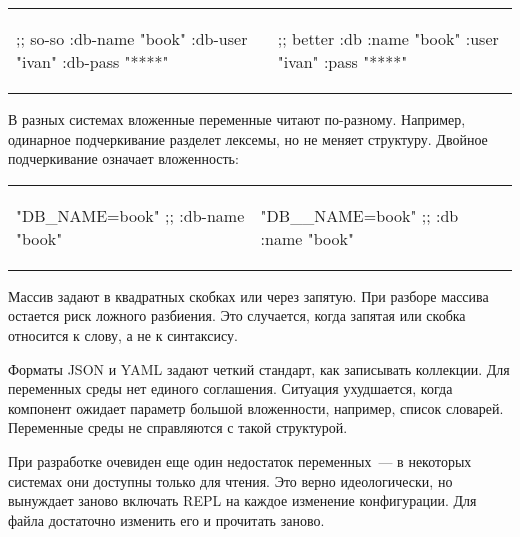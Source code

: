 \noindent
\begin{tabular}{ @{}p{5cm} @{}p{5cm} }

\begin{english}
  \begin{clojure}
;; so-so
{:db-name "book"
 :db-user "ivan"
 :db-pass "****"}
  \end{clojure}
\end{english}

&

\begin{english}
  \begin{clojure}
;; better
{:db {:name "book"
      :user "ivan"
      :pass "****"}}
  \end{clojure}
\end{english}

\end{tabular}

В разных системах вложенные переменные читают по-разному. Например, одинарное
подчеркивание разделет лексемы, но не меняет структуру. Двойное подчеркивание
означает вложенность:

\noindent
\begin{tabular}{ @{}p{5cm} @{}p{5cm} }

\begin{english}
  \begin{clojure}
"DB_NAME=book"
;; {:db-name "book"}
  \end{clojure}
\end{english}

&

\begin{english}
  \begin{clojure}
"DB__NAME=book"
;; {:db {:name "book"}}
  \end{clojure}
\end{english}

\end{tabular}

Массив задают в квадратных скобках или через запятую. При разборе массива
остается риск ложного разбиения. Это случается, когда запятая или скобка
относится к слову, а не к синтаксису.

Форматы JSON и YAML задают четкий стандарт, как записывать коллекции. Для
переменных среды нет единого соглашения. Ситуация ухудшается, когда компонент
ожидает параметр большой вложенности, например, список словарей. Переменные
среды не справляются с такой структурой.

При разработке очевиден еще один недостаток переменных~--- в некоторых системах
они доступны только для чтения. Это верно идеологически, но вынуждает заново
включать REPL на каждое изменение конфигурации. Для файла достаточно изменить
его и прочитать заново.

